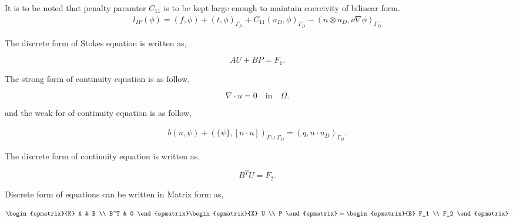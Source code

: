 \documentclass[a4paper,12pt]{book}
\begin{document}
It is to be noted that penalty paramter $C_{11}$ is to be kept large enough to maintain coercivity of bilinear form.\\

\begin{equation}
\begin{split}
l_{IP}(\phi) = (f,\phi) + (t,\phi)_{\Gamma_N} + C_{11} (u_D,\phi)_{\Gamma_D} - (n \otimes u_D, \nu \nabla \phi)_{\Gamma_D}
\end{split}
\end{equation}

The discrete form of Stokes equation is written as,

\begin{equation} \label{stokes discrete_ch3}
AU + BP = F_1 \textrm{.}
\end{equation}

The strong form of continuity equation is as follow,

\begin{equation}
\nabla \cdot u = 0 \quad \textrm{in} \quad \Omega \textrm{.}
\end{equation}

and the weak for of continuity equation is as follow,

\begin{equation}\label{contiuity_weak_ch3}
\begin{split}
b(u,\psi) + (\{\psi\},[n\cdot u])_{\Gamma \cup \Gamma_D} = (q,n\cdot u_D)_{\Gamma_D} \textrm{.}
\end{split}
\end{equation}

The discrete form of continuity equation is written as,

\begin{equation} \label{continuity discrete_ch3}
B^T U  = F_2 \textrm{.}
\end{equation}

Discrete form of equations can be written in Matrix form as, 

\begin{equation} \label{Stokes_matrix_ch3}
\begin{spmatrix}{K}
    A & B \\
    B^T & 0
\end{spmatrix}
\begin{spmatrix}{X}
    U \\
    P
\end{spmatrix}
=
\begin{spmatrix}{B}
    F_1  \\
    F_2
\end{spmatrix}
\end{equation}
\end{document}
